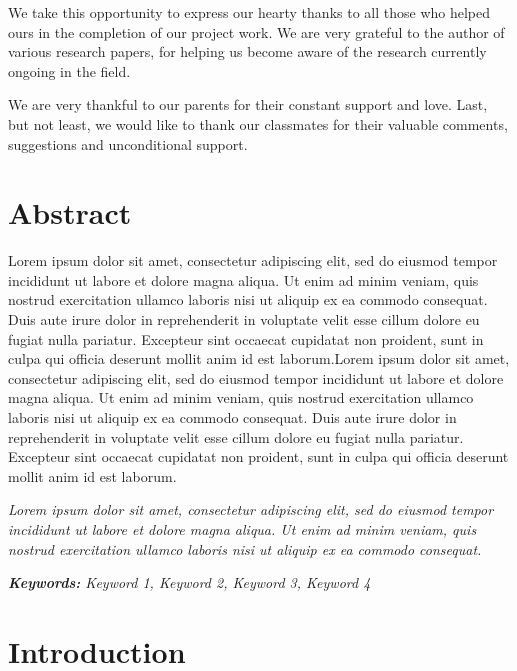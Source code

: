 \documentclass[a4paper,12 pt,oneside]{book}
\begin{document}
We take this opportunity to express our hearty thanks to all those who helped ours in the completion of our project work. We are very grateful to the author of various research papers, for helping us become aware of the research currently ongoing in the field.

We are very thankful to our parents for their constant support and love. Last, but not least, we would like to thank our classmates for their valuable comments, suggestions and unconditional support.

\chapter*{Abstract}

Lorem ipsum dolor sit amet, consectetur adipiscing elit, sed do eiusmod tempor incididunt ut labore et dolore magna aliqua. Ut enim ad minim veniam, quis nostrud exercitation ullamco laboris nisi ut aliquip ex ea commodo consequat. Duis aute irure dolor in reprehenderit in voluptate velit esse cillum dolore eu fugiat nulla pariatur. Excepteur sint occaecat cupidatat non proident, sunt in culpa qui officia deserunt mollit anim id est laborum.Lorem ipsum dolor sit amet, consectetur adipiscing elit, sed do eiusmod tempor incididunt ut labore et dolore magna aliqua. Ut enim ad minim veniam, quis nostrud exercitation ullamco laboris nisi ut aliquip ex ea commodo consequat. Duis aute irure dolor in reprehenderit in voluptate velit esse cillum dolore eu fugiat nulla pariatur. Excepteur sint occaecat cupidatat non proident, sunt in culpa qui officia deserunt mollit anim id est laborum.

\textit{Lorem ipsum dolor sit amet, consectetur adipiscing elit, sed do eiusmod tempor incididunt ut labore et dolore magna aliqua. Ut enim ad minim veniam, quis nostrud exercitation ullamco laboris nisi ut aliquip ex ea commodo consequat. }

\textit{\textbf{Keywords:} Keyword 1, Keyword 2, Keyword 3, Keyword 4}


\tableofcontents

\listoffigures

\mainmatter

\pagestyle{plain}

\chapter{Introduction}
\end{document}
